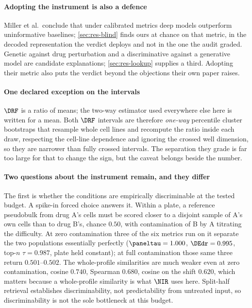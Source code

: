 \paragraph{Adopting the instrument is also a defence} Miller et al.\ conclude
that under calibrated metrics deep models outperform uninformative baselines;
\cref{sec:res-blind} finds ours at chance on that metric, in the decoded
representation the verdict deploys and not in the one the audit
graded.
Genetic against drug perturbation and a discriminative against a generative
model are candidate explanations; \cref{sec:res-lookup} supplies a third.
Adopting their metric also puts the verdict beyond the objections their own
paper raises.

\paragraph{One declared exception on the intervals} $\DRF$ is a ratio of means;
the two-way estimator used everywhere else here is written for a
mean. Both $\DRF$ intervals are therefore
\emph{one-way} percentile cluster bootstraps that resample whole cell lines and
recompute the ratio inside each draw, respecting the cell-line dependence and
ignoring the crossed well dimension, so they are narrower than fully crossed
intervals. The separation they grade is far too large for that to change the
sign, but the caveat belongs beside the number.

\paragraph{Two questions about the instrument remain, and they differ} The first
is whether the conditions are empirically discriminable at the tested budget. A
spike-in forced choice answers it. Within a plate, a reference pseudobulk from
drug A's cells must be scored closer to a disjoint sample of A's own cells than
to drug B's, chance $0.50$, with contamination of B by A titrating the
difficulty. At zero contamination three of the six metrics run on it
separate the two populations essentially perfectly ($\paneltau = 1.000$,
$\DEdr = 0.995$, top-$n$ $\tau = 0.987$, plate held constant); at full
contamination those same three return $0.501$--$0.502$. The whole-profile
similarities are much weaker even at zero contamination, cosine $0.740$,
Spearman $0.680$, cosine on the shift $0.620$, which matters because a
whole-profile similarity is what $\NIR$ uses here. Split-half retrieval
establishes discriminability, not predictability from untreated input, so
discriminability is not the sole bottleneck at this budget.

